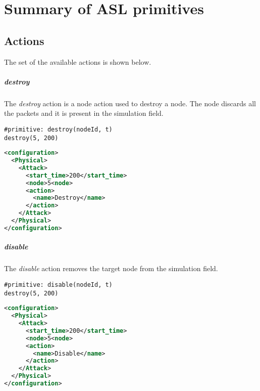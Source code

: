 

\chapter{Summary of ASL primitives}
\label{ch:asl-primitives}

\section{Actions}
The set of the available actions is shown below.

\paragraph{destroy}
The \emph{destroy} action is a node action used to destroy a node. The node discards all the packets and it is present in the simulation field.
%
\begin{lstlisting}[language={asl}, caption={ASL destroy example}]
#primitive: destroy(nodeId, t)
destroy(5, 200)
\end{lstlisting}
%
\begin{lstlisting}[language={xml}, caption={Interpreter output}]
<configuration>
  <Physical>
    <Attack>
      <start_time>200</start_time>
      <node>5<node>
      <action>
        <name>Destroy</name>
      </action>
    </Attack>
  </Physical>
</configuration>
\end{lstlisting}

\paragraph{disable}
The \emph{disable} action removes the target node from the simulation field.
%
\begin{lstlisting}[language={asl}, caption={ASL disable example}]
#primitive: disable(nodeId, t)
destroy(5, 200)
\end{lstlisting}
%
\begin{lstlisting}[language={xml}, caption={Interpreter output}]
<configuration>
  <Physical>
    <Attack>
      <start_time>200</start_time>
      <node>5<node>
      <action>
        <name>Disable</name>
      </action>
    </Attack>
  </Physical>
</configuration>
\end{lstlisting}

